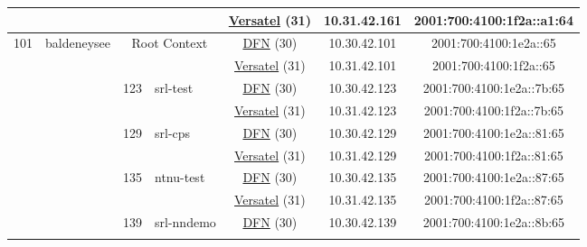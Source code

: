 \begin{small}
\begin{center}
\begin{longtable}{|c|c|c|c|c|c|c|c|}
  &  &  &  & \multicolumn{2}{|c|}{\tiny{\href{http://www.versatel.de}{Versatel} (31)}} & \tiny{10.31.42.161} & \tiny{2001:700:4100:1f2a::a1:64} \\ \hline
 \multirow{24}{*}{\tiny{101}} & \multicolumn{1}{|l|}{\multirow{24}{*}{\tiny{baldeneysee}}} & \multicolumn{2}{|c|}{\multirow{2}{*}{\tiny{Root Context}}} & \multicolumn{2}{|c|}{\tiny{\href{https://www.dfn.de}{DFN} (30)}} & \tiny{10.30.42.101} & \tiny{2001:700:4100:1e2a::65} \\* \cline{5-5}\cline{6-6}\cline{7-7}\cline{8-8}
  &  & \multicolumn{2}{|c|}{} & \multicolumn{2}{|c|}{\tiny{\href{http://www.versatel.de}{Versatel} (31)}} & \tiny{10.31.42.101} & \tiny{2001:700:4100:1f2a::65} \\* \cline{3-3}\cline{4-4}\cline{5-5}\cline{6-6}\cline{7-7}\cline{8-8}
  &  & \multirow{2}{*}{\tiny{123}} & \multicolumn{1}{|l|}{\multirow{2}{*}{\tiny{srl-test}}} & \multicolumn{2}{|c|}{\tiny{\href{https://www.dfn.de}{DFN} (30)}} & \tiny{10.30.42.123} & \tiny{2001:700:4100:1e2a::7b:65} \\* \cline{5-5}\cline{6-6}\cline{7-7}\cline{8-8}
  &  &  &  & \multicolumn{2}{|c|}{\tiny{\href{http://www.versatel.de}{Versatel} (31)}} & \tiny{10.31.42.123} & \tiny{2001:700:4100:1f2a::7b:65} \\* \cline{3-3}\cline{4-4}\cline{5-5}\cline{6-6}\cline{7-7}\cline{8-8}
  &  & \multirow{2}{*}{\tiny{129}} & \multicolumn{1}{|l|}{\multirow{2}{*}{\tiny{srl-cps}}} & \multicolumn{2}{|c|}{\tiny{\href{https://www.dfn.de}{DFN} (30)}} & \tiny{10.30.42.129} & \tiny{2001:700:4100:1e2a::81:65} \\* \cline{5-5}\cline{6-6}\cline{7-7}\cline{8-8}
  &  &  &  & \multicolumn{2}{|c|}{\tiny{\href{http://www.versatel.de}{Versatel} (31)}} & \tiny{10.31.42.129} & \tiny{2001:700:4100:1f2a::81:65} \\* \cline{3-3}\cline{4-4}\cline{5-5}\cline{6-6}\cline{7-7}\cline{8-8}
  &  & \multirow{2}{*}{\tiny{135}} & \multicolumn{1}{|l|}{\multirow{2}{*}{\tiny{ntnu-test}}} & \multicolumn{2}{|c|}{\tiny{\href{https://www.dfn.de}{DFN} (30)}} & \tiny{10.30.42.135} & \tiny{2001:700:4100:1e2a::87:65} \\* \cline{5-5}\cline{6-6}\cline{7-7}\cline{8-8}
  &  &  &  & \multicolumn{2}{|c|}{\tiny{\href{http://www.versatel.de}{Versatel} (31)}} & \tiny{10.31.42.135} & \tiny{2001:700:4100:1f2a::87:65} \\* \cline{3-3}\cline{4-4}\cline{5-5}\cline{6-6}\cline{7-7}\cline{8-8}
  &  & \multirow{2}{*}{\tiny{139}} & \multicolumn{1}{|l|}{\multirow{2}{*}{\tiny{srl-nndemo}}} & \multicolumn{2}{|c|}{\tiny{\href{https://www.dfn.de}{DFN} (30)}} & \tiny{10.30.42.139} & \tiny{2001:700:4100:1e2a::8b:65} \\* \cline{5-5}\cline{6-6}\cline{7-7}\cline{8-8}

\end{longtable}
\end{center}
\end{small}
